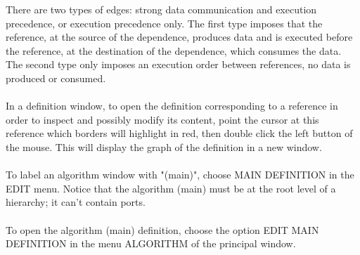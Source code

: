 \documentclass[11pt,twoside]{report}
\begin{document}
There are two types of edges: strong data communication and execution
precedence, or execution precedence only. The first type imposes that
the reference, at the source of the dependence, produces data and is
executed before the reference, at the destination of the dependence,
which consumes the data. The second type only imposes an execution
order between references, no data is produced or consumed.\\\\
In a definition window, to open the definition corresponding to a
reference in order to inspect and possibly modify its content, point
the cursor at this reference which borders will highlight in red, then
double click the left button of the mouse. This will display the graph
of the definition in a new window.\\\\To label an algorithm window
with "(main)", choose MAIN DEFINITION in the EDIT menu. Notice that
the algorithm (main) must be at the root level of a hierarchy; it
can't contain ports.\\\\To open the algorithm (main) definition,
choose the option EDIT MAIN DEFINITION in the menu ALGORITHM of the
principal window.
\end{document}
